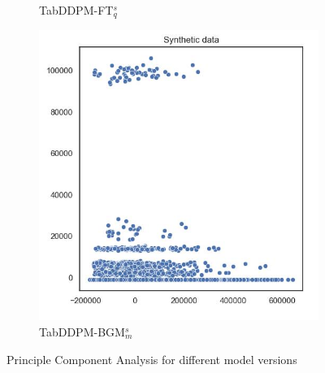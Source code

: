 \begin{figure}[h]
\begin{subfigure}{0.3\textwidth}
		\caption{TabDDPM-FT$^{s}_q$}
    \end{subfigure}
	\begin{subfigure}{0.3\textwidth}
		\includegraphics[width=\textwidth]{images/pca/tab-ddpm-bgm-simTune-minmax.jpg}
		\caption{TabDDPM-BGM$^{s}_m$}
		\label{fig_a:pca_TabDDPMBM}
    \end{subfigure}
    \caption{Principle Component Analysis for different model versions}
    \label{fig_a:pca_diff}
\end{figure}

